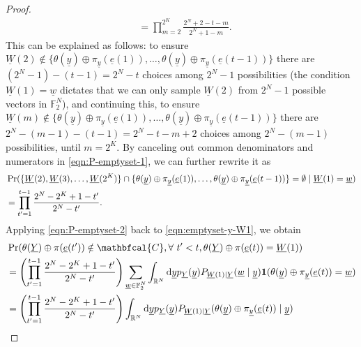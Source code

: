 \documentclass[letterpaper,draftclsnofoot,onecolumn]{IEEEtran}
\begin{document}
\begin{proof}
\begin{align}
        &= \prod_{m=2}^{2^K}\frac{2^N+2-t-m}{2^N+1-m}.\label{eqn:P-emptyset-1}
    \end{align}
    This can be explained as follows: to ensure $\underline{W}(2) \notin \{\theta(\underline{y})\oplus \pi_{\underline{y}}(\underline{e}(1)),\ldots,\theta(\underline{y})\oplus \pi_{\underline{y}}(\underline{e}(t - 1))\}$ there are $(2^N - 1) - (t - 1) = 2^N - t$ choices among $2^N - 1$ possibilities (the condition $\underline{W}(1) = \underline{w}$ dictates that we can only sample $\underline{W}(2)$ from $2^N - 1$ possible vectors in $\mathbb{F}_2^N$), and continuing this, to ensure $\underline{W}(m) \notin \{\theta(\underline{y})\oplus \pi_{\underline{y}}(\underline{e}(1)),\ldots,\theta(\underline{y})\oplus \pi_{\underline{y}}(\underline{e}(t - 1))\}$ there are $2^N - (m - 1) - (t - 1) = 2^N - t - m + 2$ choices among $2^N - (m - 1)$ possibilities, until $m = 2^K$. By canceling out common denominators and numerators in \eqref{eqn:P-emptyset-1}, we can further rewrite it as
    \begin{align}
        &\Pr(\{\underline{W}(2),\underline{W}(3),\ldots,\underline{W}(2^K)\}\cap\{\theta(\underline{y})\oplus \pi_{\underline{y}}(\underline{e}(1)),\ldots,\theta(\underline{y})\oplus \pi_{\underline{y}}(\underline{e}(t - 1))\} = \emptyset  \mid  \underline{W}(1) = \underline{w}) \notag\\
        &= \prod_{t'=1}^{t-1}\frac{2^N-2^K+1-t'}{2^N-t'}.\label{eqn:P-emptyset-2}
    \end{align}
    Applying \eqref{eqn:P-emptyset-2} back to \eqref{eqn:emptyset-y-W1}, we obtain
    \begin{align}
        & \Pr(\theta(\underline{Y})\oplus \pi(\underline{e}(t'))\notin \mathbfcal{C},\forall\ t'< t, \theta(\underline{Y})\oplus \pi(\underline{e}(t))=\underline{W}(1)) \notag\\
        &= \left(\prod_{t'=1}^{t-1}\frac{2^N-2^K+1-t'}{2^N-t'} \right) \sum_{\underline{w} \in \mathbb{F}_2^N} \int_{\mathbb{R}^N} \mathrm{d}\underline{y} p_{\underline{Y}}(\underline{y}) P_{\underline{W}(1)|\underline{Y}}(\underline{w} \mid \underline{y}) \mathbf{1}(\theta(\underline{y})\oplus \pi_{\underline{y}}(\underline{e}(t))=\underline{w}) \\
        &= \left(\prod_{t'=1}^{t-1}\frac{2^N-2^K+1-t'}{2^N-t'} \right) \int_{\mathbb{R}^N} \mathrm{d}\underline{y} p_{\underline{Y}}(\underline{y}) P_{\underline{W}(1)|\underline{Y}}(\theta(\underline{y})\oplus \pi_{\underline{y}}(\underline{e}(t)) \mid \underline{y}) \\

\end{align}
\end{proof}
\end{document}
